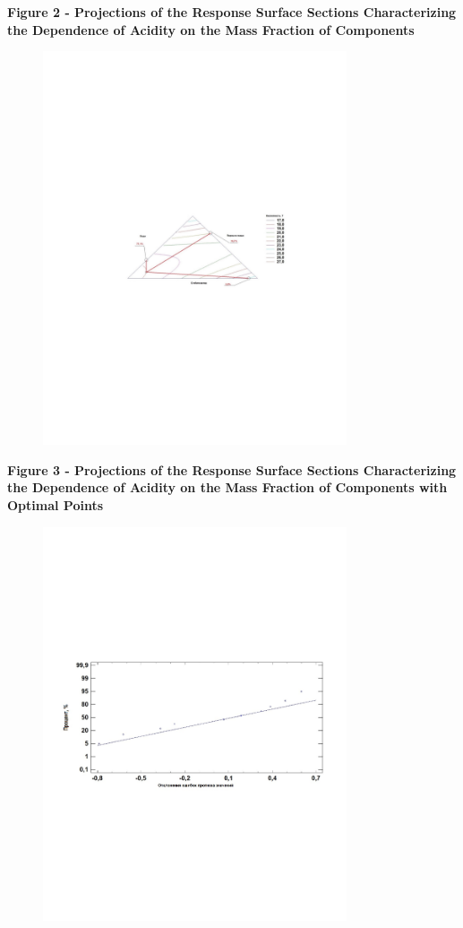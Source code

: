 {\bfseries Figure 2 - Projections of the Response Surface Sections
Characterizing the Dependence of Acidity on the Mass Fraction of
Components}

\begin{figure}[H]
	\centering
	\includegraphics[width=0.8\textwidth]{media/pish/image7}
	\caption*{}
\end{figure}


{\bfseries Figure 3 - Projections of the Response Surface Sections
Characterizing the Dependence of Acidity on the Mass Fraction of
Components with Optimal Points}

\begin{figure}[H]
	\centering
	\includegraphics[width=0.8\textwidth]{media/pish/image8}
	\caption*{}
\end{figure}


